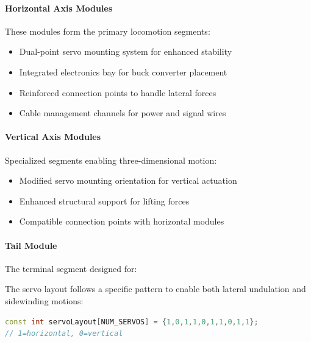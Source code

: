 \documentclass[12pt,a4paper]{report}
\begin{document}
\paragraph{Horizontal Axis Modules}
These modules form the primary locomotion segments:
\begin{itemize}
    \item Dual-point servo mounting system for enhanced stability
    \item Integrated electronics bay for buck converter placement
    \item Reinforced connection points to handle lateral forces
    \item Cable management channels for power and signal wires
\end{itemize}

\paragraph{Vertical Axis Modules}
Specialized segments enabling three-dimensional motion:
\begin{itemize}
    \item Modified servo mounting orientation for vertical actuation
    \item Enhanced structural support for lifting forces
    \item Compatible connection points with horizontal modules
\end{itemize}

\paragraph{Tail Module}
The terminal segment designed for:
\begin{itemize}
\end{itemize}

The servo layout follows a specific pattern to enable both lateral undulation and sidewinding motions:
\begin{lstlisting}[language=C++]
const int servoLayout[NUM_SERVOS] = {1,0,1,1,0,1,1,0,1,1};
// 1=horizontal, 0=vertical
\end{lstlisting}
\end{document}
